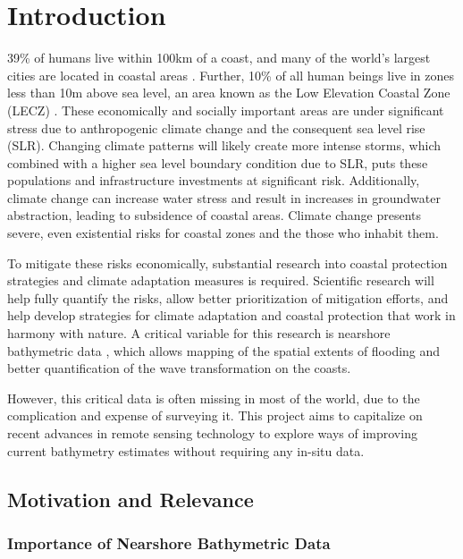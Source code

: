 \chapter{Introduction}

39\% of humans live within 100km of a coast, and many of the world's largest cities are located in coastal areas \parencite{Magdalena2021}. Further, 10\% of all human beings live in zones less than 10m above sea level, an area known as the Low Elevation Coastal Zone (LECZ) \parencite{Neumann2015,Lichter2011}. These economically and socially important areas are under significant stress due to anthropogenic climate change and the consequent sea level rise (SLR). Changing climate patterns will likely create more intense storms, which combined with a higher sea level boundary condition due to SLR, puts these populations and infrastructure investments at significant risk. Additionally, climate change can increase water stress and result in increases in groundwater abstraction, leading to subsidence of coastal areas. Climate change presents severe, even existential risks for coastal zones and the those who inhabit them.

To mitigate these risks economically, substantial research into coastal protection strategies and climate adaptation measures is required. Scientific research will help fully quantify the risks, allow better prioritization of mitigation efforts, and help develop strategies for climate adaptation and coastal protection that work in harmony with nature. A critical variable for this research is nearshore bathymetric data \parencite{Holman2013}, which allows mapping of the spatial extents of flooding and better quantification of the wave transformation on the coasts. 

However, this critical data is often missing in most of the world, due to the complication and expense of surveying it. This project aims to capitalize on recent advances in remote sensing technology to explore ways of improving current bathymetry estimates without requiring any in-situ data. 

\section{Motivation and Relevance}

\subsection{Importance of Nearshore Bathymetric Data}

